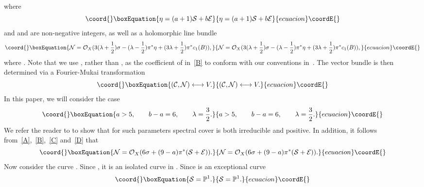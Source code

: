 \documentclass[a4paper,12pt]{article}
\numberwithin{equation}{section}
\theoremstyle{plain}
\begin{document}
%
where
%
\begin{equation}\coord{}\boxEquation{
\eta = (a+1) {\cal S} + b{\cal E}
\label{B}
}{
\eta = (a+1) {\cal S} + b{\cal E}
}{ecuacion}\coordE{}\end{equation}
%
and \coordHE{} and \coordHE{} are non-negative integers, as well as a holomorphic line
bundle
%
\begin{equation}\coord{}\boxEquation{
{\cal N} = {\cal O}_{X} ( 3(\lambda +\frac{1}{2}) \sigma  -
(\lambda -\frac{1}{2}) \pi^{*}\eta + (3 \lambda +\frac{1}{2})
\pi^{*}c_1(B)),
\label{C}
}{
{\cal N} = {\cal O}_{X} ( 3(\lambda +\frac{1}{2}) \sigma  -
(\lambda -\frac{1}{2}) \pi^{*}\eta + (3 \lambda +\frac{1}{2})
\pi^{*}c_1(B)),
}{ecuacion}\coordE{}\end{equation}
%
where \coordHE{}.
Note that we use \coordHE{}, rather than \coordHE{}, as the coefficient of \coordHE{}
in~\eqref{B} to conform with our conventions in~\cite{BDOold}.
The vector bundle \coordHE{} is then determined via a Fourier-Mukai
transformation
%
\begin{equation}\coord{}\boxEquation{
({\cal C}, {\cal N}) \longleftrightarrow V.
\label{37}
}{
({\cal C}, {\cal N}) \longleftrightarrow V.
}{ecuacion}\coordE{}\end{equation}
%
In this paper, we will consider the case
%
\begin{equation}\coord{}\boxEquation{
a > 5, \qquad b-a =6, \qquad \lambda =\frac{3}{2}.
\label{D}
}{
a > 5, \qquad b-a =6, \qquad \lambda =\frac{3}{2}.
}{ecuacion}\coordE{}\end{equation}
%
We refer the reader to \cite{BDOold} to show that for such parameters
spectral cover \coordHE{} is both irreducible and positive. In addition,
it follows from~\eqref{A},~\eqref{B},~\eqref{C} and~\eqref{D}
that
%
\begin{equation}\coord{}\boxEquation{
{\cal N} = {\cal O}_{X} (6 \sigma  +
(9-a)\pi^{*}({\cal S} + {\cal E})).
\label{38}
}{
{\cal N} = {\cal O}_{X} (6 \sigma  +
(9-a)\pi^{*}({\cal S} + {\cal E})).
}{ecuacion}\coordE{}\end{equation}
Now consider the curve \coordHE{}. Since
\coordHE{}, it is an isolated curve in \coordHE{}.
Since \coordHE{} is an exceptional curve
%
\begin{equation}\coord{}\boxEquation{
{\cal S} ={\mathbb P}^{1}.
\label{39}
}{
{\cal S} ={\mathbb P}^{1}.
}{ecuacion}\coordE{}\end{equation}
\end{document}
